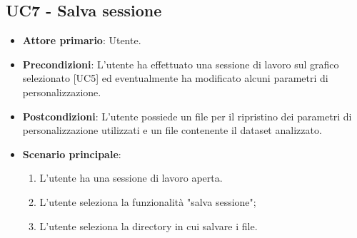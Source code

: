 \subsection{UC7 - Salva sessione}
\begin{itemize}
	\item \textbf{Attore primario}: Utente.
	\item \textbf{Precondizioni}: L'utente ha effettuato una sessione di lavoro sul grafico selezionato [UC5] ed eventualmente ha modificato alcuni parametri di personalizzazione. 
	\item \textbf{Postcondizioni}: L'utente possiede un file  per il ripristino dei parametri di personalizzazione utilizzati e un file  contenente il dataset analizzato.
	\item \textbf{Scenario principale}:
		\begin{enumerate}
			\item L'utente ha una sessione di lavoro aperta.
			\item L'utente seleziona la funzionalità "salva sessione";
			\item L'utente seleziona la directory in cui salvare i file.
		\end{enumerate}
\end{itemize}